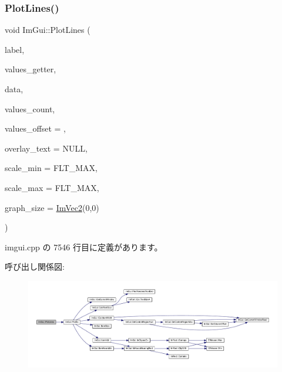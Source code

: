\subsubsection{\texorpdfstring{Plot\+Lines()}{PlotLines()}\hspace{0.1cm}{\footnotesize\ttfamily [2/2]}}
{\footnotesize\ttfamily void Im\+Gui\+::\+Plot\+Lines (\begin{DoxyParamCaption}\item[{const char $\ast$}]{label,  }\item[{float($\ast$)(void $\ast$data, int idx)}]{values\+\_\+getter,  }\item[{void $\ast$}]{data,  }\item[{int}]{values\+\_\+count,  }\item[{int}]{values\+\_\+offset = {},  }\item[{const char $\ast$}]{overlay\+\_\+text = {\ttfamily NULL},  }\item[{float}]{scale\+\_\+min = {\ttfamily FLT\+\_\+MAX},  }\item[{float}]{scale\+\_\+max = {\ttfamily FLT\+\_\+MAX},  }\item[{\mbox{\hyperlink{struct_im_vec2}{Im\+Vec2}}}]{graph\+\_\+size = {\ttfamily \mbox{\hyperlink{struct_im_vec2}{Im\+Vec2}}(0,0)} }\end{DoxyParamCaption})}



 imgui.\+cpp の 7546 行目に定義があります。

呼び出し関係図\+:\nopagebreak
\begin{figure}[H]
\begin{center}
\leavevmode
\includegraphics[width=350pt]{namespace_im_gui_a94a2645d45c96da35b834dc7db93a9f1_cgraph}
\end{center}
\end{figure}
\mbox{\label{namespace_im_gui_a017db69016de97685aec978e504dc96d}} 
